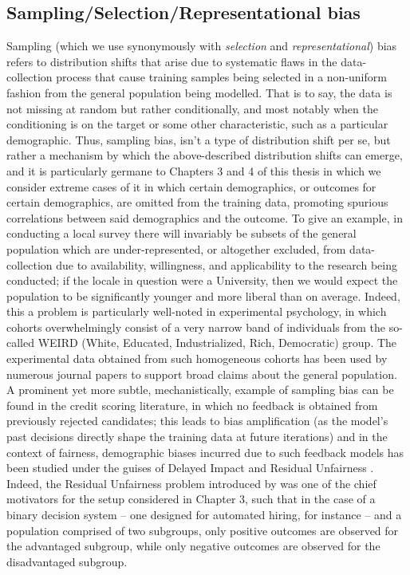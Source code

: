 \subsection{Sampling/Selection/Representational bias}\label{ssec:sampling-bias}
Sampling (which we use synonymously with \emph{selection} and \emph{representational}) bias refers
to distribution shifts that arise due to systematic flaws in the data-collection process that cause
training samples being selected in a non-uniform fashion from the general population being
modelled.
%
That is to say, the data is not missing at random but rather conditionally, and most notably when
the conditioning is on the target or some other characteristic, such as a particular demographic.
%
Thus, sampling bias, isn't a type of distribution shift per se, but rather a mechanism by which the
above-described distribution shifts can emerge, and it is particularly germane to Chapters 3 and 4
of this thesis in which we consider extreme cases of it in which certain demographics, or outcomes
for certain demographics, are omitted from the training data, promoting spurious correlations
between said demographics and the outcome.
%
To give an example, in conducting a local survey there will invariably be subsets of the general
population which are under-represented, or altogether excluded, from data-collection due to
availability, willingness, and applicability to the research being conducted; if the locale in
question were a University, then we would expect the population to be significantly younger and
more liberal than on average.
%
Indeed, this a problem is particularly well-noted in experimental psychology, in which cohorts
overwhelmingly consist of a very narrow band of individuals from the so-called WEIRD (White,
Educated, Industrialized, Rich, Democratic)\citep{henrich2010weirdest} group.
%
The experimental data obtained from such homogeneous cohorts has been used  by numerous journal
papers to support broad claims about the general population.
%
A prominent yet more subtle, mechanistically, example of sampling bias can be found in the credit
scoring literature, in which no feedback is obtained from previously rejected candidates; this
leads to bias amplification (as the model's past decisions directly shape the training data at
future iterations) and in the context of fairness, demographic biases incurred due to such feedback
models has been studied under the guises of Delayed Impact \citep{liu2018delayed} and Residual
Unfairness \citep{kallus2018residual}.
%
Indeed, the Residual Unfairness problem introduced by \cite{kallus2018residual} was one of the
chief motivators for the setup considered in Chapter 3, such that in the case of a binary decision
system -- one designed for automated hiring, for instance -- and a population comprised of two
subgroups, only positive outcomes are observed for the advantaged subgroup, while only negative
outcomes are observed for the disadvantaged subgroup.

